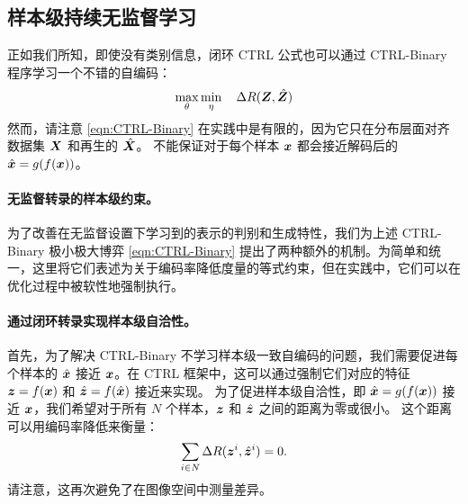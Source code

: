 \documentclass[../../book-main.tex]{subfiles}
\begin{document}
\subsection{样本级持续无监督学习}
\label{sec:sample-wise-incremental}

正如我们所知，即使没有类别信息，闭环 CTRL 公式也可以通过 CTRL-Binary 程序学习一个不错的自编码：
\begin{align}
      \max_\theta \min_\eta \quad \Delta R(\bm{Z}, \hat{\bm{Z}}) 
 \label{eqn:CTRL-Binary}
\end{align}
然而，请注意 \eqref{eqn:CTRL-Binary} 在实践中是有限的，因为它只在分布层面对齐数据集 $\bm{X}$ 和再生的 $\hat {\bm{X}}$。
不能保证对于每个样本 $\bm{x}$ 都会接近解码后的 $\hat {\bm{x}} = g(f(\bm{x}))$。

\paragraph{无监督转录的样本级约束。} 
\label{sec:constraints}
为了改善在无监督设置下学习到的表示的判别和生成特性，我们为上述 CTRL-Binary 极小极大博弈 \eqref{eqn:CTRL-Binary} 提出了两种额外的机制。为简单和统一，这里将它们表述为关于编码率降低度量的等式约束，但在实践中，它们可以在优化过程中被软性地强制执行。

\paragraph{通过闭环转录实现样本级自洽性。} 
首先，为了解决 CTRL-Binary 不学习样本级一致自编码的问题，我们需要促进每个样本的 $\hat {\bm{x}}$ 接近 $\bm{x}$。在 CTRL 框架中，这可以通过强制它们对应的特征 $\bm{z}=f(\bm{x})$ 和 $\hat {\bm{z}} = f(\hat {\bm{x}})$ 接近来实现。
为了促进样本级自洽性，即 $\hat{\bm{x}} = g(f(\bm{x}))$ 接近 $\bm{x}$，我们希望对于所有 $N$ 个样本，$\bm{z}$ 和 $\hat{\bm{z}}$ 之间的距离为零或很小。
这个距离可以用编码率降低来衡量：
\begin{align}
\sum_{i\in N} \Delta R(\z^i,\hat{\z}^i) = 0.
\label{eqn:sample-self-consistency}\vspace{-2mm}
\end{align}
请注意，这再次避免了在图像空间中测量差异。
\end{document}
